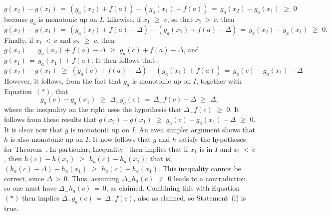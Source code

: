         \begin{displaymath}
        g(x_{2})-g(x_{1}) \,=\, (g_{a}(x_{2})+f(a)) - (g_{a}(x_{1})+f(a)) \,=\, g_{a}(x_{2})-g_{a}(x_{1})\,\,{\geq}\,\,0
        \end{displaymath}
    because $g_{a}$ is monotonic up on $I$.
    Likewise, if $x_{1}\,\,{\geq}\,\,c$, so that $x_{2}\,>\,c$, then
        \begin{displaymath}
        g(x_{2})-g(x_{1}) \,=\, (g_{a}(x_{2})+f(a)-{\Delta}) - (g_{a}(x_{1})+f(a)-{\Delta}) \,=\, g_{a}(x_{2})-g_{a}(x_{1})\,\,{\geq}\,\,0.
        \end{displaymath}
    Finally, if $x_{1}\,<\,c$ and $x_{2}\,\,{\geq}\,\,c$, then
        $g(x_{2}) \,=\, g_{a}(x_{2})+f(a)-{\Delta}\,\,{\geq}\,\,g_{a}(c)+f(a)-{\Delta}$,
and
        $g(x_{1}) \,=\, g_{a}(x_{1})+f(a)$.
    It then follows that
        \begin{displaymath}
        g(x_{2})-g(x_{1})\,\,{\geq}\,\,(g_{a}(c)+f(a)-{\Delta})-(g_{a}(x_{1})+f(a)) \,=\, g_{a}(c)-g_{a}(x_{1})-{\Delta}
        \end{displaymath}
    However, it follows, from the fact that $g_{a}$ is monotonic up on $I$, together with Equation~$({\ast})$, that
        \begin{displaymath}
        g_{a}(c)-g_{a}(x_{1})\,\,{\geq}\,\,{\Delta}_{-} g_{a}(c) \,=\, 
    {\Delta}_{-} f(c) + {\Delta}\,\,{\geq}\,\,{\Delta},
        \end{displaymath}
    where the inequality on the right uses the hypothesis that ${\Delta}_{-} f(c)\,\,{\geq}\,\,0$.
    It follows from these results that
        $g(x_{2})-g(x_{1})\,\,{\geq}\,\,g_{a}(c)-g_{a}(x_{1})-{\Delta}\,\,{\geq}\,\,0$.
    It is clear now that $g$ is monotonic up on $I$. An even simpler argument shows that $h$ is also monotonic up on $I$.
    It now follows that $g$ and $h$ satisfy the hypotheses for Theorem~.
    In particular, Inequality~ then implies that if $x_{1}$ is in $I$  and $x_{1}\,<\,c$, then
        $h(c)-h(x_{1})\,\,{\geq}\,\,h_{a}(c)-h_{a}(x_{1})$;
    that is,
        $(h_{a}(c)-{\Delta})-h_{a}(x_{1})\,\,{\geq}\,\,h_{a}(c)-h_{a}(x_{1})$.
    This inequality cannot be correct, since ${\Delta}\,>\,0$. Thus, assuming ${\Delta}_{-} h_{a}(c) \,\,{\neq}\,\, 0$ leads to a contradiction, so one must have ${\Delta}_{-} h_{a}(c) \,=\, 0$, as claimed.
    Combining this with Equation~$({\ast})$ then implies ${\Delta}_{-} g_{a}(c) \,=\, {\Delta}_{-} f(c)$, also as claimed, so Statement~(i) is true.


